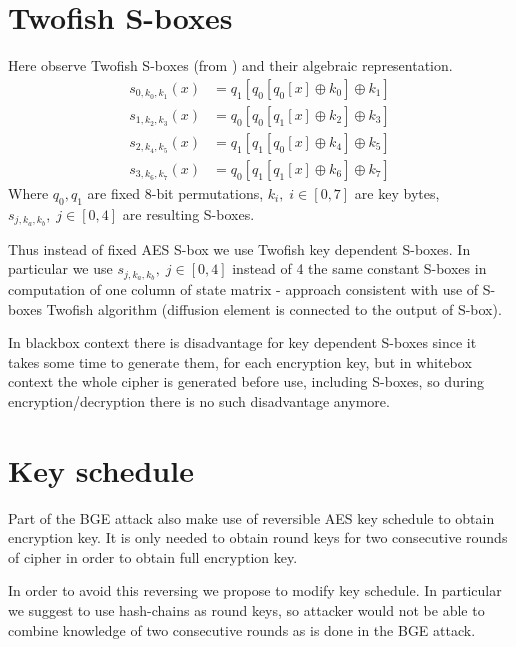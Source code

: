\documentclass[11pt,oneside,final]{fithesis2}
\begin{document}
    \section{Twofish S-boxes}\label{sec:twofish_sbox}
    Here observe Twofish S-boxes (from \citep{Schneier98twofish:a}) and their algebraic representation.
    \begin{subequations}\label{eq:twofish_sbox}
    \begin{align}
	s_{0,k_0,k_1}\left(x\right) &= q_1\left[q_0\left[q_0\left[x\right] \oplus k_0 \right] \oplus k_1 \right]\\
	s_{1,k_2,k_3}\left(x\right) &= q_0\left[q_0\left[q_1\left[x\right] \oplus k_2 \right] \oplus k_3 \right]\\
	s_{2,k_4,k_5}\left(x\right) &= q_1\left[q_1\left[q_0\left[x\right] \oplus k_4 \right] \oplus k_5 \right]\\
	s_{3,k_6,k_7}\left(x\right) &= q_0\left[q_1\left[q_1\left[x\right] \oplus k_6 \right] \oplus k_7 \right]
    \end{align}
    \end{subequations}
    Where $q_0, q_1$ are fixed 8-bit permutations, $k_i,\; i \in [0,7]$ are key bytes, $s_{j,k_a,k_b},\; j \in [0,4]$ are resulting S-boxes.

    Thus instead of fixed AES S-box we use Twofish key dependent S-boxes. In particular we use $s_{j,k_a,k_b},\; j \in [0,4]$ instead of 4 the same constant
    S-boxes in computation of one column of state matrix - approach consistent with use of S-boxes Twofish algorithm (diffusion element is connected 
    to the output of S-box). 

    In blackbox context there is disadvantage for key dependent S-boxes since it takes some time to generate them, for each encryption key, but in whitebox context
    the whole cipher is generated before use, including S-boxes, so during encryption/decryption there is no such disadvantage anymore.
   
    \section{Key schedule}
    Part of the BGE attack also make use of reversible AES key schedule to obtain encryption key. It is only needed to obtain round keys for two consecutive
    rounds of cipher in order to obtain full encryption key.

    In order to avoid this reversing we propose to modify key schedule.
    In particular we suggest to use hash-chains as round keys, so attacker would not be able to combine knowledge of two consecutive rounds as is done in the BGE attack.
    
\end{document}
